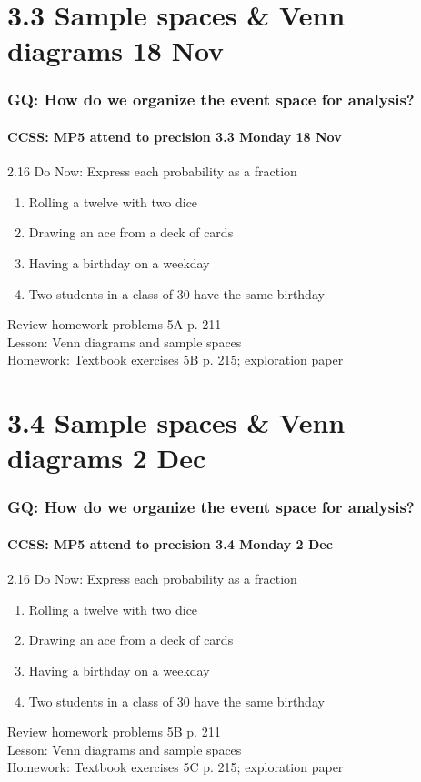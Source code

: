 \documentclass{beamer}
\begin{document}
\section{3.3 Sample spaces \& Venn diagrams 18 Nov}
\frame
{
  \frametitle{GQ: How do we organize the event space for analysis?}
  \framesubtitle{CCSS: MP5 attend to precision \hfill \alert{3.3 Monday 18 Nov}}

  \begin{block}{2.16 Do Now: Express each probability as a fraction}
  \begin{enumerate}
    \item Rolling a twelve with two dice
    \item Drawing an ace from a deck of cards
    \item Having a birthday on a weekday
    \item Two students in a class of 30 have the same birthday
  \end{enumerate}
  \end{block}
  Review homework problems 5A p. 211 \\
  Lesson: Venn diagrams and sample spaces \\ \smallskip
  Homework: Textbook exercises 5B p. 215; exploration paper
}

\section{3.4 Sample spaces \& Venn diagrams 2 Dec}
\frame
{
  \frametitle{GQ: How do we organize the event space for analysis?}
  \framesubtitle{CCSS: MP5 attend to precision \hfill \alert{3.4 Monday 2 Dec}}

  \begin{block}{2.16 Do Now: Express each probability as a fraction}
  \begin{enumerate}
    \item Rolling a twelve with two dice
    \item Drawing an ace from a deck of cards
    \item Having a birthday on a weekday
    \item Two students in a class of 30 have the same birthday
  \end{enumerate}
  \end{block}
  Review homework problems 5B p. 211 \\
  Lesson: Venn diagrams and sample spaces \\ \smallskip
  Homework: Textbook exercises 5C p. 215; exploration paper
}
\end{document}
